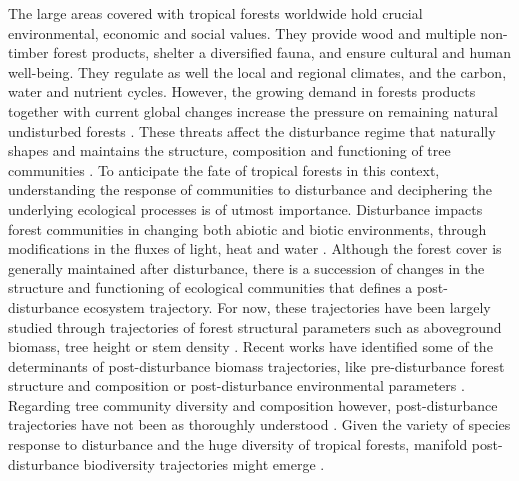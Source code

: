 \documentclass[fleqn,10pt]{ArtEcoFoG} %
\begin{document}
The large areas covered with tropical forests worldwide hold crucial
environmental, economic and social values. They provide wood and
multiple non-timber forest products, shelter a diversified fauna, and
ensure cultural and human well-being. They regulate as well the local
and regional climates, and the carbon, water and nutrient cycles.
However, the growing demand in forests products together with current
global changes increase the pressure on remaining natural undisturbed
forests \citep{Morales-Hidalgo2015}. These threats affect the
disturbance regime that naturally shapes and maintains the structure,
composition and functioning of tree communities
\citep{Schnitzer2001, Anderson-Teixeira2013, Sist2015}. To anticipate
the fate of tropical forests in this context, understanding the response
of communities to disturbance and deciphering the underlying ecological
processes is of utmost importance. Disturbance impacts forest
communities in changing both abiotic and biotic environments, through
modifications in the fluxes of light, heat and water
\citep{Goulamoussene2017}. Although the forest cover is generally
maintained after disturbance, there is a succession of changes in the
structure and functioning of ecological communities that defines a
post-disturbance ecosystem trajectory. For now, these trajectories have
been largely studied through trajectories of forest structural
parameters such as aboveground biomass, tree height or stem density
\citep{Piponiot2016, Rutishauser2016}. Recent works have identified some
of the determinants of post-disturbance biomass trajectories, like
pre-disturbance forest structure and composition or post-disturbance
environmental parameters \citep{Herault2018}. Regarding tree community
diversity and composition however, post-disturbance trajectories have
not been as thoroughly understood \citep{Guitet2018, Molino2001}. Given
the variety of species response to disturbance and the huge diversity of
tropical forests, manifold post-disturbance biodiversity trajectories
might emerge \citep{Lindenmayer2012, Garcia_florez2017}.
\end{document}
